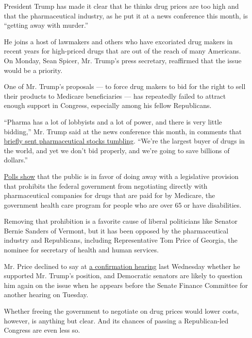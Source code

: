 President Trump has made it clear that he thinks drug prices are too
high and that the pharmaceutical industry, as he put it at a news
conference this month, is ``getting away with murder.''

He joins a host of lawmakers and others who have excoriated drug makers
in recent years for high-priced drugs that are out of the reach of many
Americans. On Monday, Sean Spicer, Mr. Trump's press secretary,
reaffirmed that the issue would be a priority.

One of Mr. Trump's proposals --- to force drug makers to bid for the
right to sell their products to Medicare beneficiaries --- has
repeatedly failed to attract enough support in Congress, especially
among his fellow Republicans.

``Pharma has a lot of lobbyists and a lot of power, and there is very
little bidding,'' Mr. Trump said at the news conference this month, in
comments that
\href{http://www.reuters.com/article/us-usa-trump-drugpricing-idUSKBN14V24J}{briefly
sent pharmaceutical stocks tumbling}. ``We're the largest buyer of drugs
in the world, and yet we don't bid properly, and we're going to save
billions of dollars.''

\href{http://kff.org/medicaid/poll-finding/medicare-and-medicaid-at-50/}{Polls
show} that the public is in favor of doing away with a legislative
provision that prohibits the federal government from negotiating
directly with pharmaceutical companies for drugs that are paid for by
Medicare, the government health care program for people who are over 65
or have disabilities.

Removing that prohibition is a favorite cause of liberal politicians
like Senator Bernie Sanders of Vermont, but it has been opposed by the
pharmaceutical industry and Republicans, including Representative Tom
Price of Georgia, the nominee for secretary of health and human
services.

Mr. Price declined to say at
\href{https://www.nytimes.com/2017/01/18/us/politics/confirmation-hearing-cabinet.html}{a
confirmation hearing} last Wednesday whether he supported Mr. Trump's
position, and Democratic senators are likely to question him again on
the issue when he appears before the Senate Finance Committee for
another hearing on Tuesday.

Whether freeing the government to negotiate on drug prices would lower
costs, however, is anything but clear. And its chances of passing a
Republican-led Congress are even less so.

